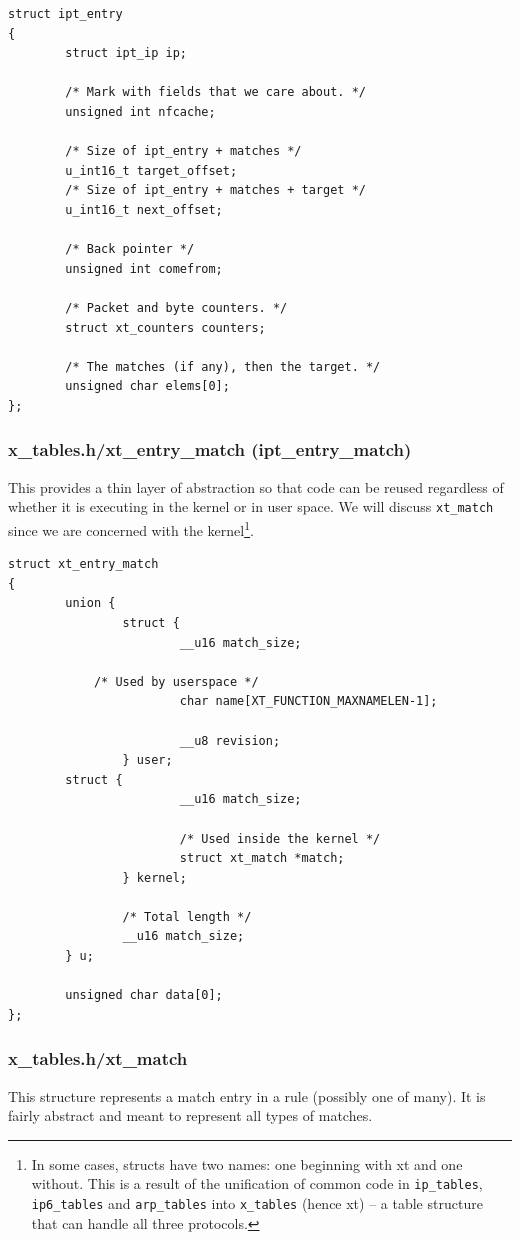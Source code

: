 \documentclass[a4paper,10pt]{article}
\newcommand{\code}[1]{\texttt{{#1}}}
\begin{document}
\begin{lstlisting}
struct ipt_entry
{
        struct ipt_ip ip;

        /* Mark with fields that we care about. */
        unsigned int nfcache;

        /* Size of ipt_entry + matches */
        u_int16_t target_offset;
        /* Size of ipt_entry + matches + target */
        u_int16_t next_offset;

        /* Back pointer */
        unsigned int comefrom;

        /* Packet and byte counters. */
        struct xt_counters counters;

        /* The matches (if any), then the target. */
        unsigned char elems[0];
};
\end{lstlisting}

\subsubsection{x\_tables.h/xt\_entry\_match (ipt\_entry\_match)}

This provides a thin layer of abstraction so that code can be reused
regardless of whether it is executing in the kernel or in user
space. We will discuss \code{xt\_match} since we are concerned with
the kernel\footnote{In some cases, structs have two names: one beginning with xt and one
without. This is a result of the unification of common code in
\code{ip\_tables}, \code{ip6\_tables} and \code{arp\_tables} into \code{x\_tables} (hence xt) -- a table
structure that can handle all three protocols.}.

\begin{lstlisting}
struct xt_entry_match
{
        union {
                struct {
                        __u16 match_size;

			/* Used by userspace */
                        char name[XT_FUNCTION_MAXNAMELEN-1];

                        __u8 revision;
                } user;
		struct {
                        __u16 match_size;

                        /* Used inside the kernel */
                        struct xt_match *match;
                } kernel;

                /* Total length */
                __u16 match_size;
        } u;

        unsigned char data[0];
};
\end{lstlisting}

\subsubsection{x\_tables.h/xt\_match}\label{xt_match}
This structure represents a match entry in a rule (possibly one of
many). It is fairly abstract and meant to represent all types of
matches.
\end{document}
